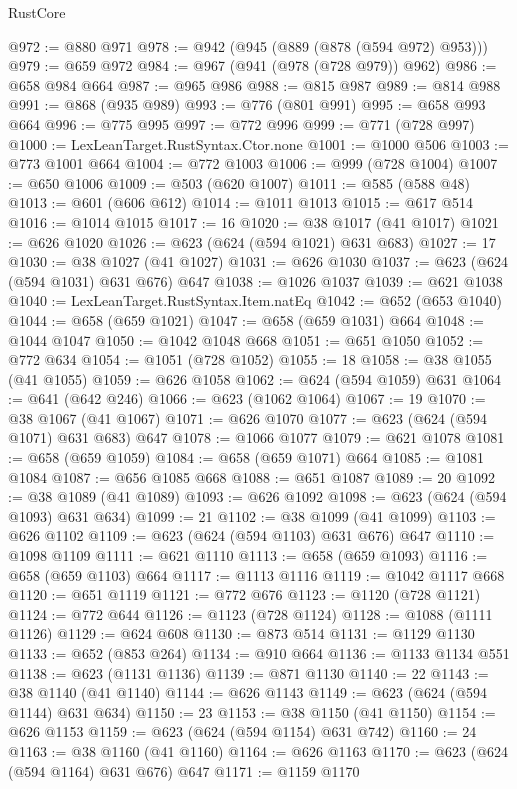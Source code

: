 \begin{lexlean}{RustCore}
\begin{coremodule}
@972 := @880 @971
@978 := @942 (@945 (@889 (@878 (@594 @972) @953)))
@979 := @659 @972
@984 := @967 (@941 (@978 (@728 @979)) @962)
@986 := @658 @984 @664
@987 := @965 @986
@988 := @815 @987
@989 := @814 @988
@991 := @868 (@935 @989)
@993 := @776 (@801 @991)
@995 := @658 @993 @664
@996 := @775 @995
@997 := @772 @996
@999 := @771 (@728 @997)
@1000 := LexLeanTarget.RustSyntax.Ctor.none
@1001 := @1000 @506
@1003 := @773 @1001 @664
@1004 := @772 @1003
@1006 := @999 (@728 @1004)
@1007 := @650 @1006
@1009 := @503 (@620 @1007)
@1011 := @585 (@588 @48)
@1013 := @601 (@606 @612)
@1014 := @1011 @1013
@1015 := @617 @514
@1016 := @1014 @1015
@1017 := 16
@1020 := @38 @1017 (@41 @1017)
@1021 := @626 @1020
@1026 := @623 (@624 (@594 @1021) @631 @683)
@1027 := 17
@1030 := @38 @1027 (@41 @1027)
@1031 := @626 @1030
@1037 := @623 (@624 (@594 @1031) @631 @676) @647
@1038 := @1026 @1037
@1039 := @621 @1038
@1040 := LexLeanTarget.RustSyntax.Item.natEq
@1042 := @652 (@653 @1040)
@1044 := @658 (@659 @1021)
@1047 := @658 (@659 @1031) @664
@1048 := @1044 @1047
@1050 := @1042 @1048 @668
@1051 := @651 @1050
@1052 := @772 @634
@1054 := @1051 (@728 @1052)
@1055 := 18
@1058 := @38 @1055 (@41 @1055)
@1059 := @626 @1058
@1062 := @624 (@594 @1059) @631
@1064 := @641 (@642 @246)
@1066 := @623 (@1062 @1064)
@1067 := 19
@1070 := @38 @1067 (@41 @1067)
@1071 := @626 @1070
@1077 := @623 (@624 (@594 @1071) @631 @683) @647
@1078 := @1066 @1077
@1079 := @621 @1078
@1081 := @658 (@659 @1059)
@1084 := @658 (@659 @1071) @664
@1085 := @1081 @1084
@1087 := @656 @1085 @668
@1088 := @651 @1087
@1089 := 20
@1092 := @38 @1089 (@41 @1089)
@1093 := @626 @1092
@1098 := @623 (@624 (@594 @1093) @631 @634)
@1099 := 21
@1102 := @38 @1099 (@41 @1099)
@1103 := @626 @1102
@1109 := @623 (@624 (@594 @1103) @631 @676) @647
@1110 := @1098 @1109
@1111 := @621 @1110
@1113 := @658 (@659 @1093)
@1116 := @658 (@659 @1103) @664
@1117 := @1113 @1116
@1119 := @1042 @1117 @668
@1120 := @651 @1119
@1121 := @772 @676
@1123 := @1120 (@728 @1121)
@1124 := @772 @644
@1126 := @1123 (@728 @1124)
@1128 := @1088 (@1111 @1126)
@1129 := @624 @608
@1130 := @873 @514
@1131 := @1129 @1130
@1133 := @652 (@853 @264)
@1134 := @910 @664
@1136 := @1133 @1134 @551
@1138 := @623 (@1131 @1136)
@1139 := @871 @1130
@1140 := 22
@1143 := @38 @1140 (@41 @1140)
@1144 := @626 @1143
@1149 := @623 (@624 (@594 @1144) @631 @634)
@1150 := 23
@1153 := @38 @1150 (@41 @1150)
@1154 := @626 @1153
@1159 := @623 (@624 (@594 @1154) @631 @742)
@1160 := 24
@1163 := @38 @1160 (@41 @1160)
@1164 := @626 @1163
@1170 := @623 (@624 (@594 @1164) @631 @676) @647
@1171 := @1159 @1170

\end{coremodule}
\end{lexlean}
